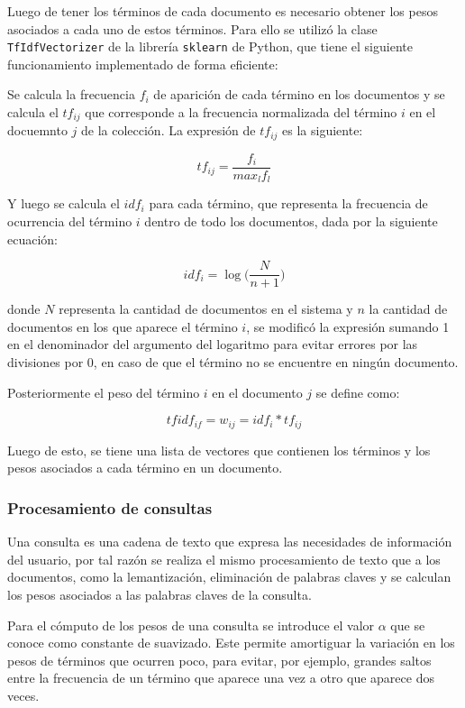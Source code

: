 Luego de tener los términos de cada documento es necesario obtener los pesos asociados a cada uno de estos términos. Para ello se utilizó la clase \verb|TfIdfVectorizer| \cite{tf} \cite{tfidf} de la librería \verb|sklearn| de Python, que tiene el siguiente funcionamiento implementado de forma eficiente:

Se calcula la frecuencia $f_i$ de aparición de cada término en los documentos y se calcula el $tf_{ij}$ que corresponde a la frecuencia normalizada del término $i$ en el docuemnto $j$ de la colección. La expresión de $tf_{ij}$ es la siguiente:

$$ tf_{ij} = \frac{f_i}{max_l f_l} $$

Y luego se calcula el $idf_i$ para cada término, que representa la frecuencia de ocurrencia del término $i$ dentro de todo los documentos, dada por la siguiente ecuación:

$$ idf_i = \log \bigg(\frac{N}{n + 1}\bigg) $$

donde $N$ representa la cantidad de documentos en el sistema y $n$ la cantidad de documentos en los que aparece el término $i$, se modificó la expresión sumando 1 en el denominador del argumento del logaritmo para evitar errores por las divisiones por 0, en caso de que el término no se encuentre en ningún documento.

Posteriormente el peso del término $i$ en el documento $j$ se define como:

$$ tfidf_{if} = w_{ij} = idf_i * tf_{ij} $$

Luego de esto, se tiene una lista de vectores que contienen los términos y los pesos asociados a cada término en un documento.

\subsubsection{Procesamiento de consultas}

Una consulta es una cadena de texto que expresa las necesidades de información del usuario, por tal razón se realiza el mismo procesamiento de texto que a los documentos, como la lemantización, eliminación de palabras claves y se calculan los pesos asociados a las palabras claves de la consulta.

Para el cómputo de los pesos de una consulta se introduce el valor $\alpha$ que se conoce como constante de suavizado. Este permite amortiguar la variación en los pesos de términos que ocurren poco, para evitar, por ejemplo, grandes saltos entre la frecuencia de un término que aparece una vez a otro que aparece dos veces.

